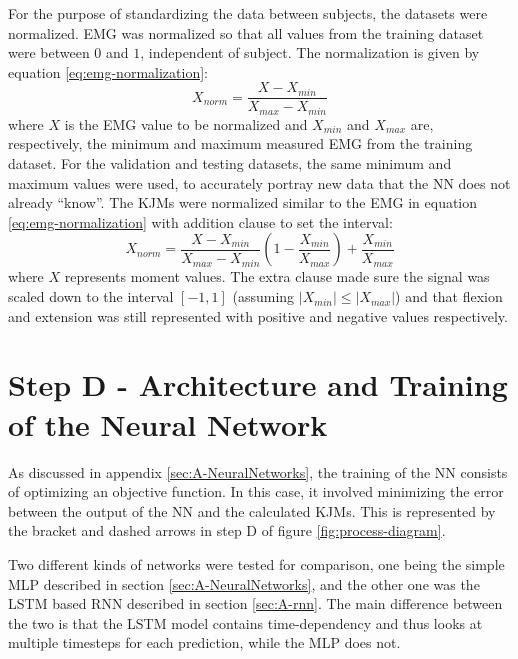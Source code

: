 \documentclass[../main.tex]{subfiles}
\begin{document}
For the purpose of standardizing the data between subjects, the datasets were normalized.
\ac{EMG} was normalized so that all values from the training dataset were between $0$ and $1$, independent of subject.
The normalization is given by equation \ref{eq:emg-normalization}:
\begin{equation}
\label{eq:emg-normalization}
    X_{norm} = \frac{X - X_{min}}{X_{max} - X_{min}}
\end{equation}
where $X$ is the \ac{EMG} value to be normalized and $X_{min}$ and $X_{max}$ are, respectively, the minimum and maximum measured \ac{EMG} from the training dataset. 
For the validation and testing datasets, the same minimum and maximum values were used, to accurately portray new data that the \ac{NN} does not already ``know''.
The \acp{KJM} were normalized similar to the \ac{EMG} in equation \ref{eq:emg-normalization} with addition clause to set the interval:
\begin{equation}
\label{eq:moment-normalization}
    X_{norm} = \frac{X - X_{min}}{X_{max} - X_{min}}\left(1 - \frac{X_{min}}{X_{max}}\right) + \frac{X_{min}}{X_{max}}
\end{equation}
where $X$ represents moment values. 
The extra clause made sure the signal was scaled down to the interval $[-1,1]$ (assuming $\left|X_{min}\right| \leq \left|X_{max}\right|$) and that flexion and extension was still represented with positive and negative values respectively.

\section{Step D - Architecture and Training of the Neural Network}
As discussed in appendix \ref{sec:A-NeuralNetworks}, the training of the \ac{NN} consists of optimizing an objective function.
In this case, it involved minimizing the error between the output of the \ac{NN} and the calculated \acp{KJM}.
This is represented by the bracket and dashed arrows in step D of figure \ref{fig:process-diagram}.

Two different kinds of networks were tested for comparison, one being the simple \ac{MLP} described in section \ref{sec:A-NeuralNetworks}, and the other one was the \ac{LSTM} based \ac{RNN} described in section \ref{sec:A-rnn}.
The main difference between the two is that the \ac{LSTM} model contains time-dependency and thus looks at multiple timesteps for each prediction, while the \ac{MLP} does not.
\end{document}
